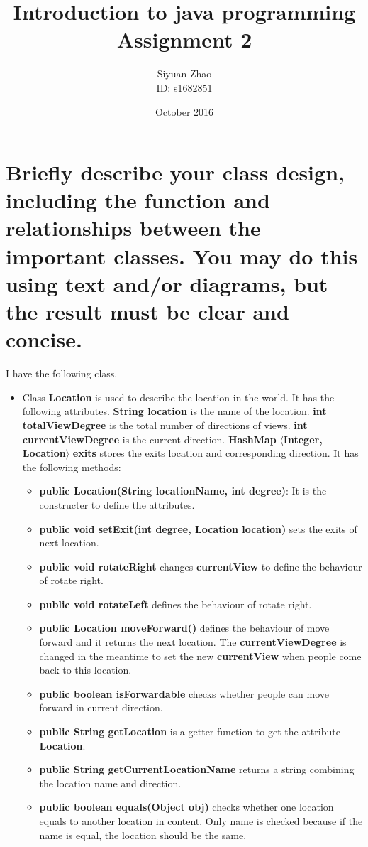 \documentclass[11pt]{article}
\title{Introduction to java programming \\ Assignment 2}
\author{Siyuan Zhao \\ ID: s1682851 }
\date{October 2016}
\begin{document}
\maketitle

\section{Briefly describe your class design, including the function and relationships between the important classes. You may do this using text and/or diagrams, but the result must be clear and concise.}
I have the following class.

\begin{itemize}
	\item Class {\bf Location} is used to describe the location in the world. It has the following attributes. {\bf String location} is the name of the location.  {\bf int totalViewDegree} is the total number of directions of views. {\bf int currentViewDegree} is the current direction. {\bf HashMap }$\langle ${\bf Integer, Location}$ \rangle$ {\bf exits} stores the exits location and corresponding direction.
		It has the following methods:
	\begin{itemize}
		\item  {\bf public Location(String locationName, int degree)}: It is the constructer to define the attributes.
		\item {\bf public void setExit(int degree, Location location)} sets the exits of next location.
		\item {\bf public void rotateRight} changes {\bf currentView} to define the behaviour of rotate right.
		\item {\bf public void rotateLeft} defines the behaviour of rotate right.
		\item {\bf public Location moveForward()} defines the behaviour of move forward and it returns the next location. The {\bf currentViewDegree} is changed in the meantime to set the new {\bf currentView} when people come back to this location.
		\item {\bf public boolean isForwardable} checks whether people can move forward in current direction.
		\item {\bf public String getLocation} is a getter function to get the attribute {\bf Location}.
		\item {\bf public String getCurrentLocationName} returns a string combining the location name and direction.
		\item {\bf public boolean equals(Object obj)} checks whether one location equals to another location in content. Only name is checked because if the name is equal, the location should be the same.


\end{itemize}
\end{itemize}
\end{document}
